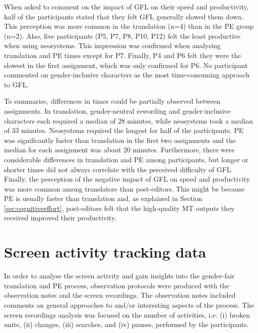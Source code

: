 When asked to comment on the impact of GFL on their speed and productivity, half of the participants stated that they felt GFL generally slowed them down. This perception was more common in the translation (n=4) than in the PE group (n=2). Also, five participants (P5, P7, P8, P10, P12) felt the least productive when using neosystems. This impression was confirmed when analysing translation and PE times except for P7. Finally, P4 and P6 felt they were the slowest in the first assignment, which was only confirmed for P6. No participant commented on gender-inclusive characters as the most time-consuming approach to GFL.

To summarise, differences in times could be partially observed between assignments. In translation, gender-neutral rewording and gender-inclusive characters each required a median of 28 minutes, while neosystems took a median of 33 minutes. Neosystems required the longest for half of the participants. PE was significantly faster than translation in the first two assignments and the median for each assignment was about 20 minutes. Furthermore, there were considerable differences in translation and PE among participants, but longer or shorter times did not always correlate with the perceived difficulty of GFL. Finally, the perception of the negative impact of GFL on speed and productivity was more common among translators than post-editors. This might be because PE is usually faster than translation and, as explained in Section \ref{sec:cognitiveeffort}, post-editors felt that the high-quality MT outputs they received improved their productivity.  

\section{Screen activity tracking data} \label{sec:technicaleffort}
In order to analyse the screen activity and gain insights into the gender-fair translation and PE process, observation protocols were produced with the observation notes and the screen recordings. The observation notes included comments on general approaches to and/or interesting aspects of the process. The screen recordings analysis was focused on the number of activities, i.e. (i) broken units, (ii) changes, (iii) searches, and (iv) pauses, performed by the participants. 

